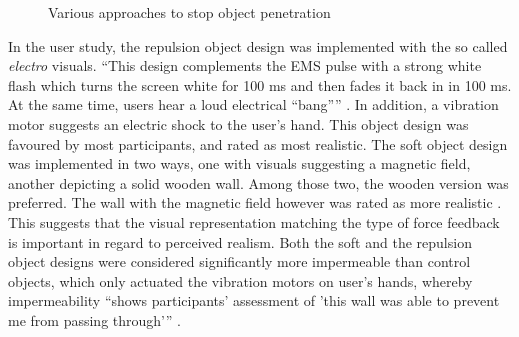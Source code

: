 \begin{figure}[h]
    \centering
    \hfill
    \hfill
    \caption{Various approaches to stop object penetration \autocite{wallHaptics}}
    \label{fig:wallHapticsDesigns}
\end{figure}

In the user study, the repulsion object design was implemented with the so called \textit{electro} visuals. \enquote{This design complements the EMS pulse with a strong white flash which turns the screen white for 100 ms and then fades it back in in 100 ms. At the same time, users hear a loud electrical “bang”} \autocite[p. ~3]{wallHaptics}. In addition, a vibration motor suggests an electric shock to the user's hand. This object design was favoured by most participants, and rated as most realistic. 
\newline
The soft object design was implemented in two ways, one with visuals suggesting a magnetic field, another depicting a solid wooden wall. Among those two, the wooden version was preferred. The wall with the magnetic field however was rated as more realistic \autocite[p. ~4]{wallHaptics}. This suggests that the visual representation matching the type of force feedback is important in regard to perceived realism.
\newline
Both the soft and the repulsion object designs were considered significantly more impermeable than control objects, which only actuated the vibration motors on user's hands, whereby impermeability \enquote{shows participants’ assessment of
'this wall was able to prevent me from passing through'} \autocite[p. ~5]{wallHaptics}.



